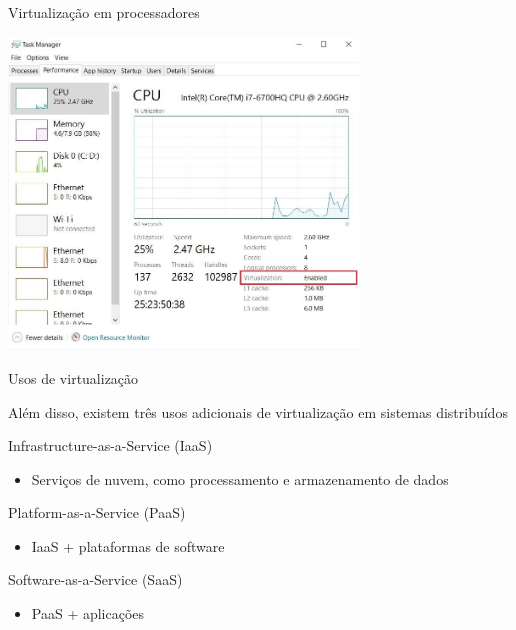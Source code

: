 \documentclass[compress]{beamer}
\begin{document}
\begin{frame}{Virtualização em processadores}

\centering \includegraphics[width=0.7\textwidth]{images/task_manager.png}

\end{frame}


\begin{frame}{Usos de virtualização}

Além disso, existem três usos adicionais de virtualização em sistemas distribuídos


Infrastructure-as-a-Service (IaaS)
\begin{itemize}
    \item Serviços de nuvem, como processamento e armazenamento de dados
\end{itemize}

Platform-as-a-Service (PaaS)
\begin{itemize}
    \item IaaS + plataformas de software 
\end{itemize}

Software-as-a-Service (SaaS)
\begin{itemize}
    \item PaaS + aplicações
\end{itemize}

\end{frame}

\end{document}
